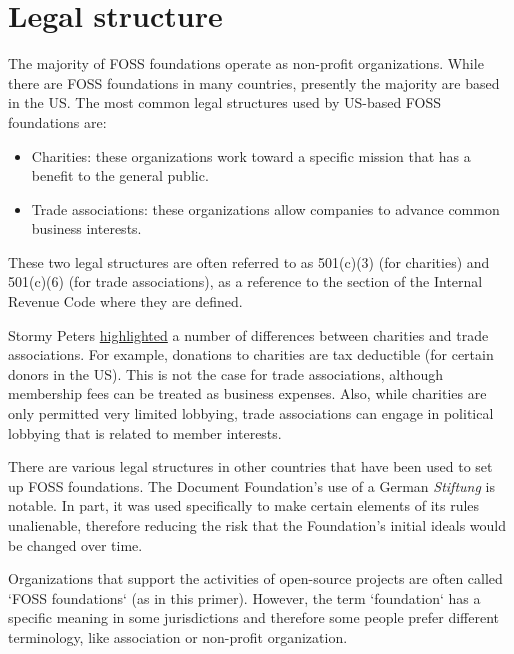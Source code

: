 


\chapter{Legal structure}

The majority of FOSS foundations operate as non-profit organizations.  While there are FOSS foundations in many countries, presently the majority are based in the US.  The most common legal structures used by US-based FOSS foundations are:

\begin{itemize}

\itemsep 0.50em

\item Charities: these organizations work toward a specific mission that has a benefit to the general public.

\item Trade associations: these organizations allow companies to advance common business interests.

\end {itemize}

These two legal structures are often referred to as 501(c)(3) (for charities) and 501(c)(6) (for trade associations), as a reference to the section of the Internal Revenue Code where they are defined.

Stormy Peters \href{http://stormyscorner.com/2008/08/501c-3-versus-6.html}{highlighted} a number of differences between charities and trade associations.  For example, donations to charities are tax deductible (for certain donors in the US).  This is not the case for trade associations, although membership fees can be treated as business expenses.  Also, while charities are only permitted very limited lobbying, trade associations can engage in political lobbying that is related to member interests.

There are various legal structures in other countries that have been used to set up FOSS foundations.  The Document Foundation's use of a German \textit{Stiftung} is notable.  In part, it was used specifically to make certain elements of its rules unalienable, therefore reducing the risk that the Foundation's initial ideals would be changed over time.

\begin{kaobox}[frametitle=FOSS foundations: what's in a name?]

Organizations that support the activities of open-source projects are often called `FOSS foundations` (as in this primer).  However, the term `foundation` has a specific meaning in some jurisdictions and therefore some people prefer different terminology, like association or non-profit organization.

\end{kaobox}

